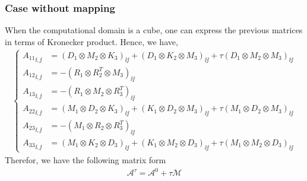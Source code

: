 \subsubsection*{Case without mapping}
When the computational domain is a cube, one can express the previous matrices in terms of Kronecker product.
Hence, we have,
\begin{align*}
  \begin{cases}
    {A_{11}}_{\ii, \jj} &= \left( D_1 \otimes M_2 \otimes K_3 \right)_{\ii \jj} 
                         + \left( D_1 \otimes K_2 \otimes M_3 \right)_{\ii \jj} 
                         + \tau \left( D_1 \otimes M_2 \otimes M_3 \right)_{\ii \jj} 
    \\
    {A_{12}}_{\ii, \jj} &= - \left( R_1 \otimes R_2^T \otimes M_3 \right)_{\ii \jj} 
    \\
    {A_{13}}_{\ii, \jj} &= - \left( R_1 \otimes M_2 \otimes R_3^T \right)_{\ii \jj} 
    \\
    {A_{22}}_{\ii, \jj} & = \left( M_1 \otimes D_2 \otimes K_3 \right)_{\ii \jj} 
                         + \left( K_1 \otimes D_2 \otimes M_3 \right)_{\ii \jj} 
                         + \tau \left( M_1 \otimes D_2 \otimes M_3 \right)_{\ii \jj} 
    \\
    {A_{23}}_{\ii, \jj} &= - \left( M_1 \otimes R_2 \otimes R_3^T \right)_{\ii \jj} 
    \\
    {A_{33}}_{\ii, \jj} &= \left( M_1 \otimes K_2 \otimes D_3 \right)_{\ii \jj} 
                         + \left( K_1 \otimes M_2 \otimes D_3 \right)_{\ii \jj} 
                         + \tau \left( M_1 \otimes M_2 \otimes D_3 \right)_{\ii \jj} 
  \end{cases}
\end{align*}
Therefor, we have the following matrix form 
\begin{align}
  \mathcal{A}^\tau = \mathcal{A}^0 + \tau \mathcal{M}
\end{align}
